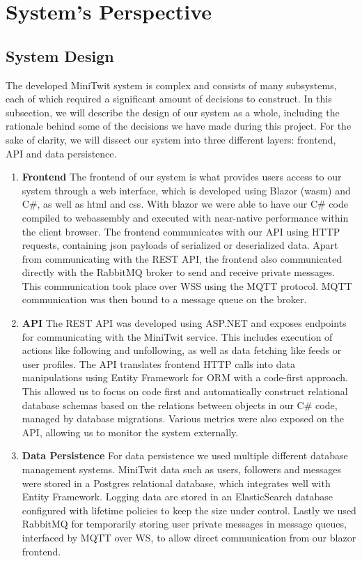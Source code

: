 \section{System's Perspective}
  \subsection{System Design}
  The developed MiniTwit system is complex and consists of many subsystems, each of which required a significant amount of decisions to construct.
  In this subsection, we will describe the design of our system as a whole, including the rationale behind some of the decisions we have made during this project.
  \newline
  For the sake of clarity, we will dissect our system into three different layers: frontend, API and data persistence.
  \begin{enumerate}
    \item \textbf{Frontend}\newline
    The frontend of our system is what provides users access to our system through a web interface, which is developed using Blazor (wasm) and C\#, as well as html and css.
    With blazor we were able to have our C\# code compiled to webassembly and executed with near-native performance within the client browser.
    The frontend communicates with our API using HTTP requests, containing json payloads of serialized or deserialized data.
    Apart from communicating with the REST API, the frontend also communicated directly with the RabbitMQ broker to send and receive private messages.
    This communication took place over WSS using the MQTT protocol. MQTT communication was then bound to a message queue on the broker.
    
    \item \textbf{API}\newline
    The REST API was developed using ASP.NET and exposes endpoints for communicating with the MiniTwit service. 
    This includes execution of actions like following and unfollowing, as well as data fetching like feeds or user profiles.
    The API translates frontend HTTP calls into data manipulations using Entity Framework for ORM with a code-first approach.
    This allowed us to focus on code first and automatically construct relational database schemas based on the relations between objects in our C\# code, managed by database migrations.
    Various metrics were also exposed on the API, allowing us to monitor the system externally.
    
    \item \textbf{Data Persistence}\newline
    For data persistence we used multiple different database management systems. 
    MiniTwit data such as users, followers and messages were stored in a Postgres relational database, which integrates well with Entity Framework.
    Logging data are stored in an ElasticSearch database configured with lifetime policies to keep the size under control.
    Lastly we used RabbitMQ for temporarily storing user private messages in message queues, interfaced by MQTT over WS, to allow direct communication from our blazor frontend.
  \end{enumerate}

